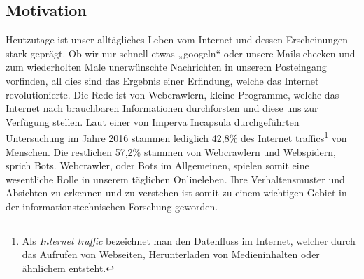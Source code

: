 \subsection{Motivation}
Heutzutage ist unser alltägliches Leben vom Internet und dessen Erscheinungen stark geprägt. Ob wir nur schnell etwas „googeln“ oder unsere Mails checken und zum wiederholten Male unerwünschte Nachrichten in unserem Posteingang vorfinden, all dies sind das Ergebnis einer Erfindung, welche das Internet revolutionierte. Die Rede ist von Webcrawlern, kleine Programme, welche das Internet nach brauchbaren Informationen durchforsten und diese uns zur Verfügung stellen. 
Laut einer von Imperva Incapsula durchgeführten Untersuchung im Jahre 2016 stammen lediglich 42,8\% \cite{bot-report-2016} des Internet traffics\footnote{Als \emph{Internet traffic} bezeichnet man den Datenfluss im Internet, welcher durch das Aufrufen von Webseiten, Herunterladen von Medieninhalten oder ähnlichem entsteht.} von Menschen. Die restlichen 57,2\% \cite{bot-report-2016} stammen von Webcrawlern und Webspidern, sprich Bots. Webcrawler, oder Bots im Allgemeinen, spielen somit eine wesentliche Rolle in unserem täglichen Onlineleben. Ihre Verhaltensmuster und Absichten zu erkennen und zu verstehen ist somit zu einem wichtigen Gebiet in der informationstechnischen Forschung geworden.